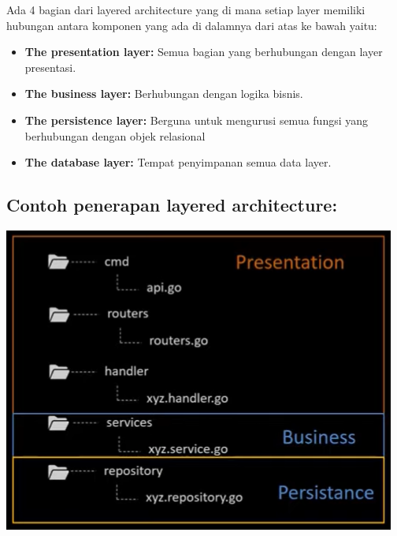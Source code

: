 Ada 4 bagian dari layered architecture yang di mana setiap layer memiliki hubungan antara komponen yang ada di dalamnya dari atas ke bawah yaitu:

\begin{itemize}
    \item \textbf{The presentation layer:} Semua bagian yang berhubungan dengan layer presentasi.
    \item \textbf{The business layer:} Berhubungan dengan logika bisnis.
    \item \textbf{The persistence layer:} Berguna untuk mengurusi semua fungsi yang berhubungan dengan objek relasional
    \item \textbf{The database layer:} Tempat penyimpanan semua data layer.
\end{itemize}

\subsection*{Contoh penerapan layered architecture:}

\includegraphics[width=\textwidth]{../images/chapter05/contoh}

